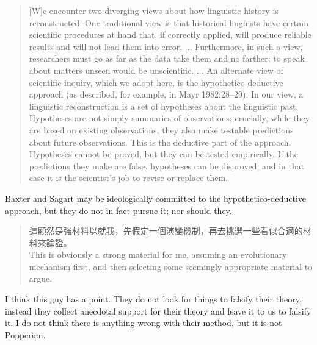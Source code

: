 \begin{quote}
[W]e encounter two diverging views about how linguistic history
is reconstructed. One traditional view is that historical linguists have certain scientific
procedures at hand that, if correctly applied, will produce reliable results and will not
lead them into error.
... 
Furthermore, in such a view, researchers must go as far as the data take them and no
farther; to speak about matters unseen would be unscientific.
...
An alternate view of scientific inquiry, which we
adopt here, is the hypothetico-deductive approach (as described, for example, in Mayr
1982:28–29). In our view, a linguistic reconstruction is a set of hypotheses about
the linguistic past. Hypotheses are not simply summaries of observations; crucially,
while they are based on existing observations, they also make testable predictions
about future observations. This is the deductive part of the approach. Hypotheses
cannot be proved, but they can be tested empirically. If the predictions they make are
false, hypotheses can be disproved, and in that case it is the scientist's job to revise
or replace them. \citep[5]{Baxter2014OldChinese}
\end{quote}



Baxter and Sagart may be ideologically committed to the hypothetico-deductive approach, but they do not in fact pursue it; nor should they. 


\begin{quote}
這顯然是強材料以就我，先假定一個演變機制，再去挑選一些看似合適的材料來論證。\\
This is obviously a strong material for me, assuming an evolutionary mechanism first, and then selecting some seemingly appropriate material to argue.
\end{quote}

I think this guy has a point. They do not look for things to falsify their theory, instead they collect anecdotal support for their theory and leave it to us to falsify it. I do not think there is anything wrong with their method, but it is not Popperian. 

